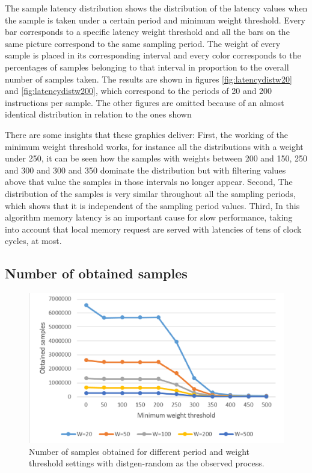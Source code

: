 The sample latency distribution shows the distribution of the latency values when the sample is taken under a certain period and minimum weight threshold. Every bar corresponds to a specific latency weight threshold and all the bars on the same picture correspond to the same sampling period. The weight of every sample is placed in its corresponding interval and every color corresponds to the percentages of samples belonging to that interval in proportion to the overall number of samples taken.  The results are shown in figures \ref{fig:latencydistw20} and \ref{fig:latencydistw200}, which correspond to the periods of 20 and 200 instructions per sample. The other figures are omitted because of an almost identical distribution in relation to the ones shown

There are some insights that these graphics deliver: First, the working of the minimum weight threshold works, for instance all the distributions with a weight under 250, it can be seen how the samples with weights between 200 and 150, 250 and 300 and 300 and 350 dominate the distribution but with filtering values above that value the samples in those intervals no longer appear. Second, The distribution of the samples is very similar throughout all the sampling periods, which shows that it is independent of the sampling period values. Third, In this algorithm memory latency is an important cause for slow performance, taking into account that local memory request are served with latencies of tens of clock cycles, at most.


\subsection{Number of obtained samples}\label{subsection:pmu-obtainedsamp}


\begin{figure}[th]
	\centering
		\includegraphics[width=.8\textwidth]{figures/number-samples.eps}
		\caption{Number of samples obtained for different period and weight threshold settings with distgen-random as the observed process.}
		\label{fig:pmu-obtainedsamp}
\end{figure}


